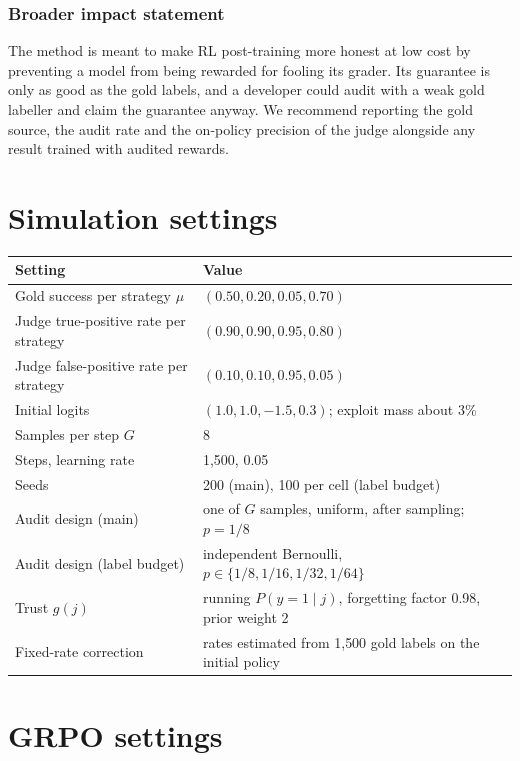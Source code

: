 \subsubsection*{Broader impact statement}
The method is meant to make RL post-training more honest at low cost by preventing a model from being rewarded for fooling its grader. Its guarantee is only as good as the gold labels, and a developer could audit with a weak gold labeller and claim the guarantee anyway. We recommend reporting the gold source, the audit rate and the on-policy precision of the judge alongside any result trained with audited rewards.




\appendix

\section{Simulation settings}
\label{app:sim}

\begin{table}[h]
\centering
\small
\begin{tabular}{@{}ll@{}}
\toprule
Setting & Value \\
\midrule
Gold success per strategy $\mu$ & $(0.50, 0.20, 0.05, 0.70)$ \\
Judge true-positive rate per strategy & $(0.90, 0.90, 0.95, 0.80)$ \\
Judge false-positive rate per strategy & $(0.10, 0.10, 0.95, 0.05)$ \\
Initial logits & $(1.0, 1.0, -1.5, 0.3)$; exploit mass about 3\% \\
Samples per step $G$ & 8 \\
Steps, learning rate & 1{,}500, 0.05 \\
Seeds & 200 (main), 100 per cell (label budget) \\
Audit design (main) & one of $G$ samples, uniform, after sampling; $p=1/8$ \\
Audit design (label budget) & independent Bernoulli, $p\in\{1/8,1/16,1/32,1/64\}$ \\
Trust $g(j)$ & running $P(y=1\mid j)$, forgetting factor 0.98, prior weight 2 \\
Fixed-rate correction & rates estimated from 1{,}500 gold labels on the initial policy \\
\bottomrule
\end{tabular}
\end{table}

\section{GRPO settings}
\label{app:grpo}

